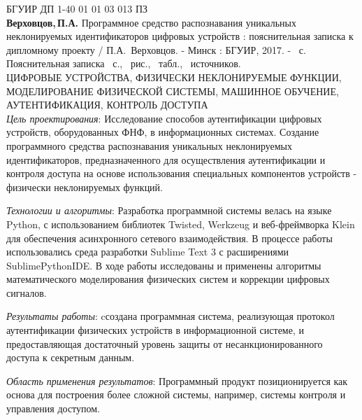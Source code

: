\thispagestyle{empty}
\noindent БГУИР ДП 1-40 01 01 03 013 ПЗ
\\

\textbf{Верховцов,\,П.А.} Программное средство распознавания уникальных неклонируемых идентификаторов цифровых устройств : пояснительная записка к дипломному проекту / П.А.~Верховцов. - Минск : БГУИР, 2017. - \pageref*{LastPage}~с.
\\

Пояснительная записка \pageref*{LastPage}~с., \totfig{}~рис., \tottab{}~табл., \totref{}~источников.
\\

\MakeUppercase{цифровые устройства, физически неклонируемые функции, моделирование физической системы, машинное обучение, аутентификация, контроль доступа}
\\

\emph{Цель проектирования}: Исследование способов аутентификации цифровых устройств, оборудованных ФНФ, в информационных системах. Создание программного средства распознавания уникальных неклонируемых идентификаторов, предназначенного для осуществления аутентификации и контроля доступа на основе использования специальных компонентов устройств - физически неклонируемых функций.

\emph{Технологии и алгоритмы}: Разработка программной системы велась на языке Python, с использованием библиотек Twisted, Werkzeug и веб-фреймворка Klein для обеспечения асинхронного сетевого взаимодействия. В процессе работы использовались среда разработки Sublime Text 3 с расширениями SublimePythonIDE. В ходе работы исследованы и применены алгоритмы математического моделирования физических систем и коррекции цифровых сигналов.

\emph{Результаты работы}: cсоздана программная система, реализующая протокол аутентификации физических устройств в информационной системе, и предоставляющая достаточный уровень защиты от несанкционированного доступа к секретным данным.

\emph{Область применения результатов}: Программный продукт позиционируется как основа для построения более сложной системы, например, системы контроля и управления доступом.


\clearpage
